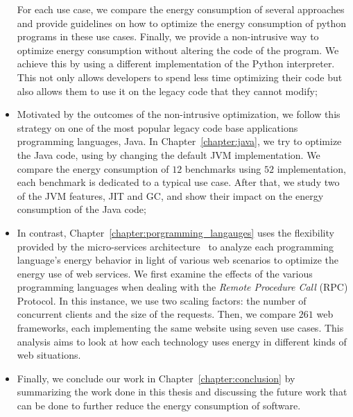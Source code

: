 \begin{itemize}
          For each use case, we compare the energy consumption of several approaches and provide guidelines on how to optimize the energy consumption of python programs in these use cases.
          Finally, we provide a non-intrusive way to optimize energy consumption without altering the code of the program.
          We achieve this by using a different implementation of the Python interpreter.
          This not only allows developers to spend less time optimizing their code but also allows them to use it on the legacy code that they cannot modify;
    \item Motivated by the outcomes of the non-intrusive optimization, we follow this strategy on one of the most popular legacy code base applications programming languages, Java.
          In Chapter~\ref{chapter:java}, we try to optimize the Java code, using by changing the default JVM implementation.
          We compare the energy consumption of $12$ benchmarks using $52$ implementation, each benchmark is dedicated to a typical use case.
          After that, we study two of the JVM features, JIT and GC, and show their impact on the energy consumption of the Java code;
    \item In contrast, Chapter~\ref{chapter:porgramming_langauges}  uses the flexibility provided by the micro-services architecture~\cite{dmitry2014micro} to analyze each programming language's energy behavior in light of various web scenarios to optimize the energy use of web services.
          We first examine the effects of the various programming languages when dealing with the \emph{Remote Procedure Call} (RPC) Protocol.
          In this instance, we use two scaling factors: the number of concurrent clients and the size of the requests. Then, we compare $261$ web frameworks, each implementing the same website using seven use cases.
          This analysis aims to look at how each technology uses energy in different kinds of web situations.
    \item Finally, we conclude our work in Chapter~\ref{chapter:conclusion} by summarizing the work done in this thesis and discussing the future work that can be done to further reduce the energy consumption of software.
\end{itemize}


